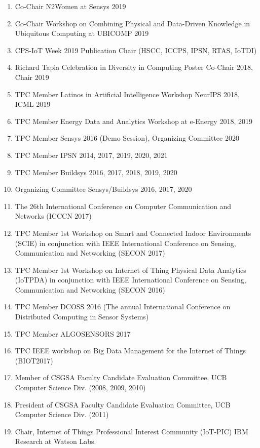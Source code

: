 \documentclass[12pt]{article}
\begin{document}
\begin{enumerate}
    \item Co-Chair N2Women at Sensys 2019
    \item Co-Chair Workshop on Combining Physical and Data-Driven Knowledge in Ubiquitous Computing at UBICOMP 2019
    \item CPS-IoT Week 2019 Publication Chair (HSCC, ICCPS, IPSN, RTAS, IoTDI)
    \item Richard Tapia Celebration in Diversity in Computing Poster Co-Chair 2018, Chair 2019
    \item TPC Member Latinos in Artificial Intelligence Workshop NeurIPS 2018, ICML 2019
    \item TPC Member Energy Data and Analytics Workshop at e-Energy 2018, 2019
    \item TPC Member Sensys 2016 (Demo Session), Organizing Committee 2020
    \item TPC Member IPSN 2014, 2017, 2019, 2020, 2021
    \item TPC Member Buildsys 2016, 2017, 2018, 2019, 2020
    \item Organizing Committee Sensys/Buildsys 2016, 2017, 2020
    \item The 26th International Conference on Computer Communication and Networks (ICCCN 2017)
    \item TPC Member 1st Workshop on Smart and Connected Indoor Environments (SCIE) in conjunction with IEEE International Conference on Sensing, Communication and Networking (SECON 2017)
    \item TPC Member 1st Workshop on Internet of Thing Physical Data Analytics (IoTPDA) in conjunction with IEEE International Conference on Sensing, Communication and Networking (SECON 2016)
    \item TPC Member DCOSS 2016 (The annual International Conference on
    Distributed Computing in Sensor Systems)
    \item TPC Member ALGOSENSORS 2017 
    \item TPC IEEE workshop on Big Data Management for the Internet of Things (BIOT2017)
    \item Member of CSGSA Faculty Candidate Evaluation Committee, UCB Computer Science Div. (2008, 2009, 2010)
    \item President of CSGSA Faculty Candidate Evaluation Committee, UCB Computer Science Div. (2011)
    \item Chair, Internet of Things Professional Interest Community (IoT-PIC) IBM Research at Watson Labs.
\end{enumerate}
\end{document}
